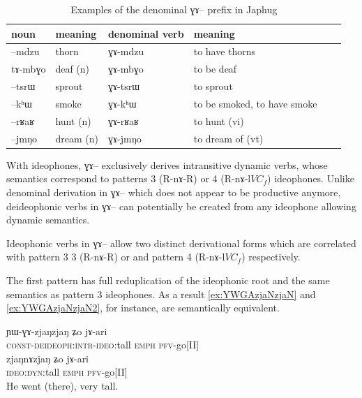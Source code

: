 \documentclass[oldfontcommands,oneside,a4paper,11pt]{article}
\newcommand{\ipa}[1]{{\phon \mbox{#1}}} %
\begin{document}
 \begin{table}[h]
 \caption{Examples of the denominal \ipa{ɣɤ--} prefix in Japhug} \label{tab:denom.GA}
\begin{tabular}{llllll}
\toprule
noun &meaning &denominal verb & meaning\\
\midrule
 \ipa{--mdzu} &thorn & \ipa{ɣɤ-mdzu} &to have thorns \\
  \ipa{tɤ-mbɣo} &deaf (n) & \ipa{ɣɤ-mbɣo} &to be deaf \\
\midrule
 \ipa{--tsrɯ} &sprout & \ipa{ɣɤ-tsrɯ} &to sprout\\
  \ipa{--kʰɯ} &smoke & \ipa{ɣɤ-kʰɯ} &to be smoked, to have smoke \\
    \midrule
  \ipa{--rʁaʁ} &hunt (n) & \ipa{ɣɤ-rʁaʁ} &to hunt (vi) \\
   \ipa{--jmŋo} &dream (n) & \ipa{ɣɤ-jmŋo} &to dream of (vt) \\ 
  \bottomrule
  \end{tabular}
 \end{table}
 
 With ideophones, \ipa{ɣɤ--} exclusively derives intransitive dynamic verbs, whose semantics correspond to patterns 3 (R-\ipa{nɤ}-R) or 4 (R-\ipa{nɤ-l}$VC_f$) ideophones. Unlike denominal derivation in \ipa{ɣɤ--} which does not appear to be productive anymore,  deideophonic verbs in \ipa{ɣɤ--} can potentially be created from any ideophone allowing dynamic semantics.
 
Ideophonic verbs in \ipa{ɣɤ--} allow two distinct derivational forms which are correlated with pattern 3 3 (R-\ipa{nɤ}-R) or  and pattern 4 (R-\ipa{nɤ-l}$VC_f$) respectively.

 The first pattern has full reduplication of the ideophonic root and the same semantics as pattern 3 ideophones. As a result  \ref{ex:YWGAzjaNzjaN} and \ref{ex:YWGAzjaNzjaN2}, for instance, are semantically equivalent. 

 		 

     \begin{exe}
\ex \label{ex:YWGAzjaNzjaN}
\gll 
 \ipa{ɲɯ-ɣɤ-zjaŋzjaŋ}  	\ipa{ʑo}  	\ipa{jɤ-ari}  \\
 \textsc{const-deideoph:intr-ideo}:tall   \textsc{emph} \textsc{pfv}-go[II]\\
 \ex \label{ex:YWGAzjaNzjaN2}
\gll 
 \ipa{zjaŋnɤzjaŋ}  	\ipa{ʑo}  	\ipa{jɤ-ari}  \\
 \textsc{ideo:dyn}:tall   \textsc{emph} \textsc{pfv}-go[II]\\
 \glt He went (there), very tall.
\end{exe}
\end{document}
